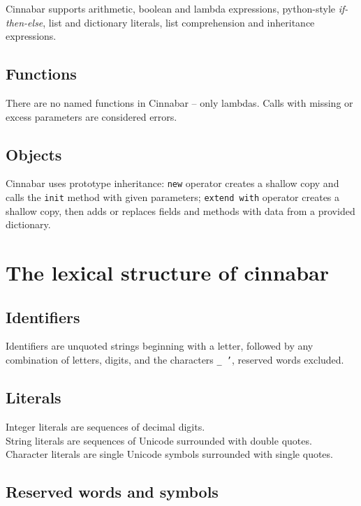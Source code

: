 \documentclass[a4paper,11pt]{article}
\begin{document}
Cinnabar supports arithmetic, boolean and lambda expressions, python-style \emph{if-then-else}, list and dictionary literals, list comprehension and inheritance expressions.

\subsection*{Functions}

There are no named functions in Cinnabar -- only lambdas.
Calls with missing or excess parameters are considered errors.

\subsection*{Objects}

Cinnabar uses prototype inheritance: {\tt new} operator creates a shallow copy and calls the {\tt init} method with given parameters; {\tt extend with} operator creates a shallow copy, then adds or replaces fields and methods with data from a provided dictionary.


\section*{The lexical structure of cinnabar}
\subsection*{Identifiers}
Identifiers  are unquoted strings beginning with a letter,
followed by any combination of letters, digits, and the characters {\tt \_ '},
reserved words excluded.


\subsection*{Literals}

Integer literals  are sequences of decimal digits.\\
String literals  are sequences of Unicode surrounded with double quotes.\\
Character literals  are single Unicode symbols surrounded with single quotes.





\subsection*{Reserved words and symbols}
\end{document}
